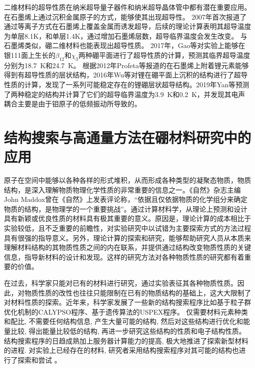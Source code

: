 二维材料的超导性质在纳米超导量子器件\cite{pribiag2015edge}和纳米超导晶体管\cite{el2013superconductivity}中都有潜在重要应用。在石墨烯上通过沉积金属原子的方式，能够使其出现超导性。
2007年首次报道了通过等离子方式在石墨烯上覆盖金属而诱发超导\cite{uchoa2007superconducting}，后续的理论计算表明其超导温度为单层8.1K\cite{gholami2018superconducting}，和单层1.4K\cite{yang2014superconducting}，通过增加石墨烯层数，超导临界温度会发生改变。
与石墨烯类似，硼二维材料也能表现出超导性质。
2017年，Gao等\cite{gao2017prediction}对实验上能够在银111面上生长的$\beta_{12}$和$\chi_3$两种硼平面进行了超导性质的计算，预测其临界超导温度分别为\SI{18.7}{\kelvin}和\SI{24.7}{\kelvin}。
根据2012年Profeta等\cite{profeta2012phonon}报道的在石墨烯上附着锂元素能够得到有超导性质的层状结构，2016年Wu等\cite{wu2016lithium}对锂在硼平面上沉积的结构进行了超导性质的计算，发现了一系列可能稳定存在的锂硼层状超导结构。2019年Yan等\cite{yan2019prediction}预测了两种稳定的结构并计算了它们的超导临界温度为\SI{3.9}{\kelvin}和\SI{0.2}{\kelvin}，并发现其电声耦合主要是由于钼原子的低频振动所导致的。

\section{结构搜索与高通量方法在硼材料研究中的应用}

原子在空间中能够以各种各样的形式堆积，从而形成各种类型的凝聚态物质，物质结构，是深入理解物质物理化学性质的非常重要的信息之一。《自然》杂志主编John Maddox曾在《自然》上发表评论称，“依据且仅依据物质的化学组分来确定物质的结构，是物理学的一个重要挑战”。通过计算材料学，从理论上预测和设计具有新颖或优良性质的材料具有极其重要的意义。原因是，理论计算的成本相比于实验较低，且不乏重要的前瞻性，对实验研究中以试错为主要探索方式的方法过程具有很强的指导意义。另外，理论计算的探索和研究，能够帮助研究人员从本质来理解材料结构的其物质性质之间的内在联系，并提供通过结构改变物质性质的关键信息，指导新材料的设计和发现。这样的研究方法对各种物质性质的研究都有着重要的价值。

在过去，科学家只能对已有的材料进行研究，通过实验表征其各种物质性质。因此，对物质性质的改性也往往只能限制在已有的物质结构的基础上，这大大限制了对材料性质的探索。近年来，科学家发展了一些新的结构搜索程序比如基于粒子群优化机制的CALYPSO程序\cite{wang2012calypso}、基于遗传算法的USPEX程序\cite{glass2006uspex}。
仅需要材料元素种类和配比, 不需要任何结构信息, 产生大量可能的结构, 然后对这些结构进行优化和能量比较, 得出能量比较低的结构, 再进一步研究这些结构的性质和电子结构性质。结构搜索程序的日趋成熟加上服务器计算能力的提高, 极大地推进了探索新型材料的进程. 对实验上已经存在的材料, 研究者采用结构搜索程序对其可能的结构也进行了探索和尝试 。

